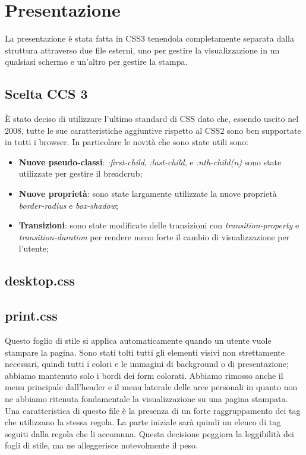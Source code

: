 \section{Presentazione}
	La presentazione è stata fatta in CSS3 tenendola completamente separata dalla struttura attraverso due file esterni, uno per gestire la visualizzazione in un qualsiasi schermo e un'altro per gestire la stampa.
	\subsection{Scelta CCS 3}
	È stato deciso di utilizzare l'ultimo standard di CSS dato che, essendo uscito nel 2008, tutte le sue caratteristiche aggiuntive rispetto al CSS2 sono ben supportate in tutti i browser. In particolare le novità che sono state utili sono:
	\begin{itemize}
		\item \textbf{Nuove pseudo-classi}: \emph{:first-child}, \emph{:last-child}, e \emph{:nth-child(n)} sono state utilizzate per gestire il breadcrub;
		\item \textbf{Nuove proprietà}: sono state largamente utilizzate la nuove proprietà \emph{border-radius} e \emph{box-shadow};
		\item \textbf{Transizioni}: sono state modificate delle transizioni con \emph{transition-property} e \emph{transition-duration} per rendere meno forte il cambio di visualizzazione per l'utente;
	\end{itemize}
	\subsection{desktop.css}

	\subsection{print.css}
	Questo foglio di stile si applica automaticamente quando un utente vuole
stampare la pagina. Sono stati tolti tutti gli elementi visivi non strettamente necessari, quindi tutti i colori e le immagini di background o di presentazione; abbiamo mantenuto solo i bordi dei form colorati. Abbiamo rimosso anche il menu principale dall'header e il menu laterale delle aree personali in quanto non ne abbiamo ritenuta fondamentale la visualizzazione su una pagina stampata. Una caratteristica di questo file è la presenza di un forte raggruppamento dei tag che utilizzano la stessa regola. La parte iniziale sarà quindi un elenco di tag seguiti dalla regola che li accomuna. Questa decisione peggiora la leggibilità dei fogli di stile, ma ne alleggerisce notevolmente il peso.




